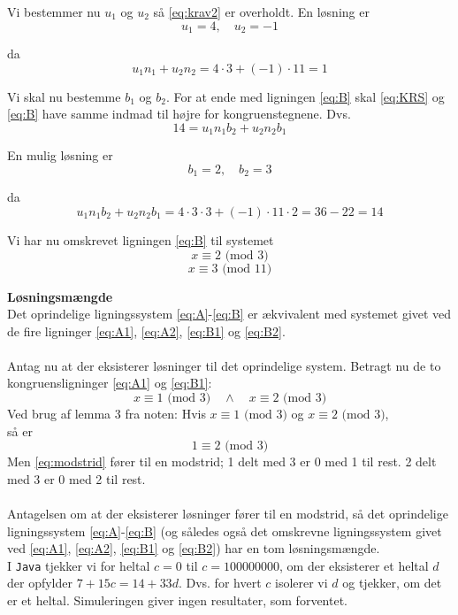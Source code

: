 Vi bestemmer nu $u_1$ og $u_2$ så \eqref{eq:krav2} er overholdt. En løsning er 
\begin{equation*}
u_1 = 4, \quad u_2 = -1
\end{equation*}

da \begin{equation*}
u_1 n_1 + u_2 n_2 = 4 \cdot 3 + (-1) \cdot 11 = 1
\end{equation*}

Vi skal nu bestemme $b_1$ og $b_2$. For at ende med ligningen \eqref{eq:B} skal \eqref{eq:KRS} og \eqref{eq:B} have samme indmad til højre for kongruenstegnene. Dvs. 
\begin{equation*}
14 = u_1 n_1 b_2 + u_2 n_2 b_1
\end{equation*}

En mulig løsning er 
\begin{equation*}
b_1 = 2, \quad b_2 = 3
\end{equation*}

da
\begin{equation*}
u_1 n_1 b_2 + u_2 n_2 b_1 = 4 \cdot 3 \cdot 3 + (-1) \cdot 11 \cdot 2 = 36 - 22 = 14
\end{equation*}

Vi har nu omskrevet ligningen \eqref{eq:B} til systemet
\begin{equation}\label{eq:B1}
x \equiv 2 \text{ (mod 3)}
\end{equation}
\vspace{-0.55cm}
\begin{equation}\label{eq:B2}
x \equiv 3 \text{  (mod 11)}    
\end{equation}

\textbf{Løsningsmængde}\\
Det oprindelige ligningssystem \eqref{eq:A}-\eqref{eq:B} er ækvivalent med systemet givet ved de fire ligninger \eqref{eq:A1}, \eqref{eq:A2}, \eqref{eq:B1} og \eqref{eq:B2}.\\
\\
Antag nu at der eksisterer løsninger til det oprindelige system. Betragt nu de to kongruensligninger \eqref{eq:A1} og \eqref{eq:B1}:
\begin{equation}
x \equiv 1 \text{ (mod 3)} \quad \land \quad x \equiv 2 \text{ (mod 3)}
\end{equation}
Ved brug af lemma 3 fra noten:
Hvis $x \equiv 1  \text{ (mod 3)}$ og $x \equiv 2 \text{ (mod 3)}$, \\så er 
\begin{equation}\label{eq:modstrid}
1 \equiv 2 \text{ (mod 3)}
\end{equation}
Men \eqref{eq:modstrid} fører til en modstrid; 1 delt med 3 er 0 med 1 til rest. 2 delt med 3 er 0 med 2 til rest.\\
\\
Antagelsen om at der eksisterer løsninger fører til en modstrid, så det oprindelige ligningssystem \eqref{eq:A}-\eqref{eq:B} (og således også det omskrevne ligningssystem givet ved \eqref{eq:A1}, \eqref{eq:A2}, \eqref{eq:B1} og \eqref{eq:B2}) har en tom løsningsmængde.\\

I \texttt{Java} tjekker vi for heltal $c=0$ til $c=100000000$, om der eksisterer et heltal $d$ der opfylder $7 + 15c = 14 + 33d$. Dvs. for hvert $c$ isolerer vi $d$ og tjekker, om det er et heltal. Simuleringen giver ingen resultater, som forventet.



